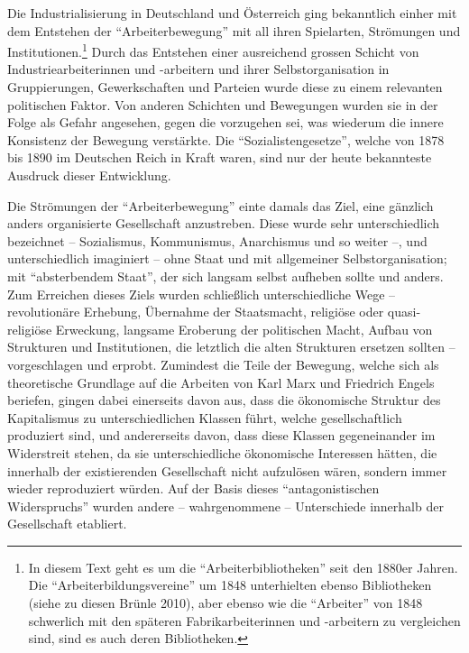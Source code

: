 \documentclass[a4paper,
fontsize=11pt,
oneside,
numbers=noperiodatend,
parskip=half-,
bibliography=totoc,
final
]{scrartcl}
\begin{document}
Die Industrialisierung in Deutschland und Österreich ging bekanntlich
einher mit dem Entstehen der \enquote{Arbeiterbewegung} mit all ihren
Spielarten, Strömungen und Institutionen.\footnote{In diesem Text geht
  es um die \enquote{Arbeiterbibliotheken} seit den 1880er Jahren. Die
  \enquote{Arbeiterbildungsvereine} um 1848 unterhielten ebenso
  Bibliotheken (siehe zu diesen Brünle 2010), aber ebenso wie die
  \enquote{Arbeiter} von 1848 schwerlich mit den späteren
  Fabrikarbeiterinnen und -arbeitern zu vergleichen sind, sind es auch
  deren Bibliotheken.} Durch das Entstehen einer ausreichend grossen
Schicht von Industriearbeiterinnen und -arbeitern und ihrer
Selbstorganisation in Gruppierungen, Gewerkschaften und Parteien wurde
diese zu einem relevanten politischen Faktor. Von anderen Schichten und
Bewegungen wurden sie in der Folge als Gefahr angesehen, gegen die
vorzugehen sei, was wiederum die innere Konsistenz der Bewegung
verstärkte. Die \enquote{Sozialistengesetze}, welche von 1878 bis 1890
im Deutschen Reich in Kraft waren, sind nur der heute bekannteste
Ausdruck dieser Entwicklung.

Die Strömungen der \enquote{Arbeiterbewegung} einte damals das Ziel,
eine gänzlich anders organisierte Gesellschaft anzustreben. Diese wurde
sehr unterschiedlich bezeichnet -- Sozialismus, Kommunismus, Anarchismus
und so weiter --, und unterschiedlich imaginiert -- ohne Staat und mit
allgemeiner Selbstorganisation; mit \enquote{absterbendem Staat}, der
sich langsam selbst aufheben sollte und anders. Zum Erreichen dieses
Ziels wurden schließlich unterschiedliche Wege -- revolutionäre
Erhebung, Übernahme der Staatsmacht, religiöse oder quasi-religiöse
Erweckung, langsame Eroberung der politischen Macht, Aufbau von
Strukturen und Institutionen, die letztlich die alten Strukturen
ersetzen sollten -- vorgeschlagen und erprobt. Zumindest die Teile der
Bewegung, welche sich als theoretische Grundlage auf die Arbeiten von
Karl Marx und Friedrich Engels beriefen, gingen dabei einerseits davon
aus, dass die ökonomische Struktur des Kapitalismus zu unterschiedlichen
Klassen führt, welche gesellschaftlich produziert sind, und andererseits
davon, dass diese Klassen gegeneinander im Widerstreit stehen, da sie
unterschiedliche ökonomische Interessen hätten, die innerhalb der
existierenden Gesellschaft nicht aufzulösen wären, sondern immer wieder
reproduziert würden. Auf der Basis dieses \enquote{antagonistischen
Widerspruchs} wurden andere -- wahrgenommene -- Unterschiede innerhalb
der Gesellschaft etabliert.
\end{document}
